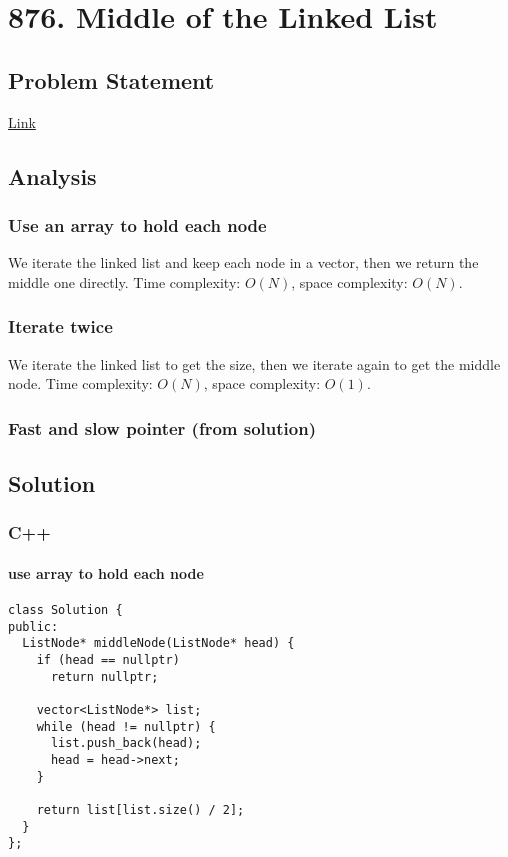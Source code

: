 \documentclass[11pt]{article}
\begin{document}
\section{876. Middle of the Linked List}
\label{sec:orgc5f9888}
\subsection{Problem Statement}
\label{sec:org7037bd7}
\href{https://leetcode.com/problems/middle-of-the-linked-list/}{Link}
\subsection{Analysis}
\label{sec:orgd1c064e}
\subsubsection{Use an array to hold each node}
\label{sec:org27e46f0}
We iterate the linked list and keep each node in a vector, then we return the middle one directly. Time complexity: \(O(N)\), space complexity: \(O(N)\).
\subsubsection{Iterate twice}
\label{sec:org93a2212}
We iterate the linked list to get the size, then we iterate again to get the middle node. Time complexity: \(O(N)\), space complexity: \(O(1)\).
\subsubsection{Fast and slow pointer (from solution)}
\label{sec:org6245805}

\subsection{Solution}
\label{sec:org5556376}
\subsubsection{C++}
\label{sec:orgcab5e1e}
\paragraph{use array to hold each node}
\label{sec:org08f48c1}
\begin{verbatim}
class Solution {
public:
  ListNode* middleNode(ListNode* head) {
    if (head == nullptr)
      return nullptr;

    vector<ListNode*> list;
    while (head != nullptr) {
      list.push_back(head);
      head = head->next;
    }

    return list[list.size() / 2];
  }
};
\end{verbatim}
\end{document}
